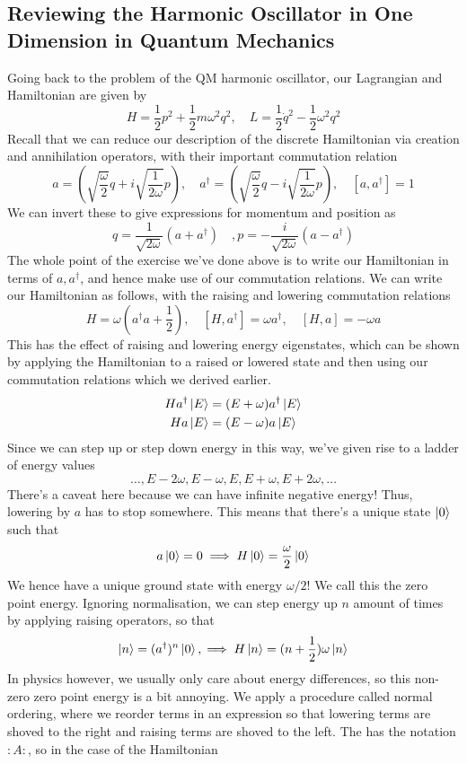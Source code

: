 \documentclass[11pt, oneside]{article}   	%
\theoremstyle{newline}
\theoremstyle{newline}
\theoremstyle{newline}
\theoremstyle{newline}
\theoremstyle{newline}
\begin{document}
\subsection{Reviewing the Harmonic Oscillator in One Dimension in Quantum Mechanics} 
Going back to the problem of the QM harmonic oscillator, our Lagrangian and Hamiltonian are given by 
\[ 
H  = \frac{1}{2}  p^2 + \frac{1}{2} m \omega^2 q^2, \quad L = \frac{1}{ 2} \dot{ q} ^2  - \frac{1}{ 2} \omega^2 q^2 
\]
Recall that we can reduce our description of the discrete Hamiltonian via creation and annihilation operators, with their important commutation relation 
\[ 
a = \left( \sqrt{\frac{\omega}{2}}  q + i \sqrt{\frac{1}{2 \omega}} p \right), \quad a^{\dagger} = \left( \sqrt{\frac{\omega}{2}}  q - i \sqrt{\frac{1}{2 \omega}} p \right), \quad [a, a^\dagger] = 1 
\] 
We can invert these to give expressions for momentum and position as 
\[ 
q = \frac{1}{ \sqrt{ 2 \omega} } ( a + a^\dagger) \quad, p =  - \frac{ i}{ \sqrt{ 2 \omega} } ( a - a^\dagger) 
\] 
The whole point of the exercise we've done above is to write our Hamiltonian in terms of $a, a^\dagger$, and hence make use of our commutation relations. We can write our Hamiltonian as follows, with the raising and lowering commutation relations
\[ 
H = \omega \left( a^\dagger a + \frac{1}{2} \right), \quad [ H, a^\dagger]  = \omega a^\dagger, \quad [ H, a ] = - \omega a  
\] 
This has the effect of raising and lowering energy eigenstates, which can be shown by applying the Hamiltonian to a raised or lowered state and then using our commutation relations which we derived earlier. 
\begin{align*} 
H a^\dagger\ket{ E} & = ( E+ \omega ) a^\dagger \ket{E} \\
H a \ket{ E}  & = ( E - \omega ) a \ket{E} 
\end{align*} 
Since we can step up or step down energy in this way, we've given rise to a ladder of energy values
\[ 
\dots, E - 2 \omega, E - \omega, E, E + \omega, E+ 2 \omega, \dots 
\] 
There's a caveat here because we can have infinite negative energy! Thus, lowering by $a$ has to stop somewhere. This means that there's a unique state  $\ket{0} $such that 
\[ 	
a \ket{0}  =0 \implies H \ket{ 0 }  = \frac{\omega}{ 2} \ket{ 0 } 
\] We hence have a unique ground state with energy $\omega / 2 $! We call this the zero point energy. Ignoring normalisation, we can step energy up $n$ amount of times by applying raising operators, so that 
\[ 	
\ket{n} = ( a^\dagger)^n \ket{ 0}, \implies H\ket{n}  = (n + \frac{ 1}{ 2})\omega\ket{n} 
\]
In physics however, we usually only care about energy differences, so this non-zero zero point energy is a bit annoying. We apply a procedure called normal ordering, where we reorder terms in an expression so that lowering terms are shoved to the right and raising terms are shoved to the left. The has the notation $: A:$, so in the case of the Hamiltonian 
\end{document}
